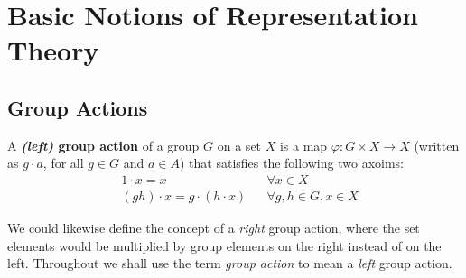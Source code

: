 
\chapter{Basic Notions of Representation Theory} %






%
\section {Group Actions}
\begin{defn}\label{def-grp-action}
A  \textbf{\textit{(left)} group action} of a group $G$ on a set $X$ is a map $\varphi \colon G \times X \to X$ (written as $g \cdot a$, for all $g \in G$ and $a \in A$) that satisfies the following two axoims:
\begin{align}
\label{grp-action-axiom-1}&1 \cdot  x = x && \forall x \in X\\
\label{grp-action-axiom-2}&(gh) \cdot x  = g \cdot (h \cdot x) && \forall g,h \in G, x \in X
\end{align}
\end{defn}
\begin{note}
We could likewise define the concept of a \textit{right} group action, where the set elements would be multiplied by group elements on the right instead of on the left.  Throughout we shall use the term \textit{group action} to mean a \textit{left} group action.
\end{note}


